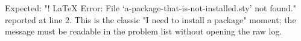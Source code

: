 \documentclass{article}
\begin{document}
Expected: "! LaTeX Error: File `a-package-that-is-not-installed.sty' not found."
reported at line 2. This is the classic "I need to install a package" moment;
the message must be readable in the problem list without opening the raw log.
\end{document}
